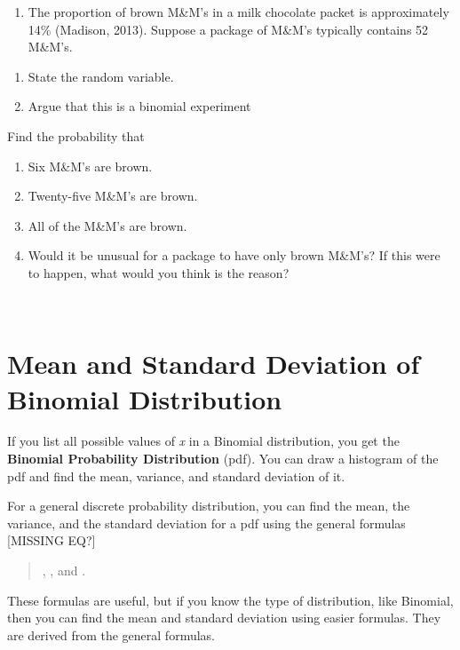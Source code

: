 \documentclass[]{book}
\providecommand{\tightlist}{%
  \setlength{\itemsep}{0pt}\setlength{\parskip}{0pt}}
\begin{document}
\begin{enumerate}
\def\labelenumi{\arabic{enumi}.}
\setcounter{enumi}{9}
\tightlist
\item
  The proportion of brown M\&M's in a milk chocolate packet is
  approximately 14\% (Madison, 2013). Suppose a package of M\&M's
  typically contains 52 M\&M's.
\end{enumerate}

\begin{enumerate}
\def\labelenumi{\alph{enumi}.}
\item
  State the random variable.
\item
  Argue that this is a binomial experiment
\end{enumerate}

Find the probability that

\begin{enumerate}
\def\labelenumi{\alph{enumi}.}
\setcounter{enumi}{2}
\item
  Six M\&M's are brown.
\item
  Twenty-five M\&M's are brown.
\item
  All of the M\&M's are brown.
\item
  Would it be unusual for a package to have only brown M\&M's? If this
  were to happen, what would you think is the reason?
\end{enumerate}

\textbf{\\
}

\hypertarget{mean-and-standard-deviation-of-binomial-distribution}{%
\section{Mean and Standard Deviation of Binomial Distribution}\label{mean-and-standard-deviation-of-binomial-distribution}}

If you list all possible values of \emph{x} in a Binomial distribution, you get the \textbf{Binomial Probability Distribution} (pdf). You can draw a histogram of the pdf and find the mean, variance, and standard deviation of it.

For a general discrete probability distribution, you can find the mean, the variance, and the standard deviation for a pdf using the general formulas {[}MISSING EQ?{]}

\begin{quote}
, , and .
\end{quote}

These formulas are useful, but if you know the type of distribution, like Binomial, then you can find the mean and standard deviation using easier formulas. They are derived from the general formulas.
\end{document}
